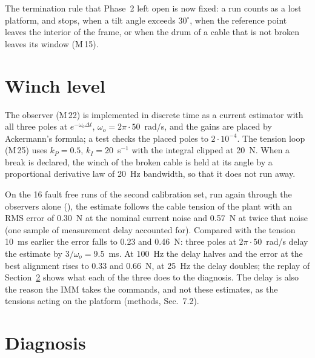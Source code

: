 \documentclass[10pt]{article}
\begin{document}
The termination rule that Phase~2 left open is now fixed: a run counts as a lost platform, and stops, when a tilt angle exceeds $30^\circ$, when the reference point leaves the interior of the frame, or when the drum of a cable that is not broken leaves its window (M\,15).

\section{Winch level}\label{sec:winch}

The observer (M\,22) is implemented in discrete time as a current estimator with all three poles at $e^{-\omega_o\Delta t}$, $\omega_o=2\pi\cdot50$~rad/s, and the gains are placed by Ackermann's formula; a test checks the placed poles to $2\cdot10^{-4}$. The tension loop (M\,25) uses $k_P=0.5$, $k_I=20$~s$^{-1}$ with the integral clipped at 20~N. When a break is declared, the winch of the broken cable is held at its angle by a proportional derivative law of 20~Hz bandwidth, so that it does not run away.

On the 16 fault free runs of the second calibration set, run again through the observers alone (), the estimate follows the cable tension of the plant with an RMS error of 0.30~N at the nominal current noise and 0.57~N at twice that noise (one sample of measurement delay accounted for). Compared with the tension 10~ms earlier the error falls to 0.23 and 0.46~N: three poles at $2\pi\cdot50$~rad/s delay the estimate by $3/\omega_o=9.5$~ms. At 100~Hz the delay halves and the error at the best alignment rises to 0.33 and 0.66~N, at 25~Hz the delay doubles; the replay of Section~\ref{sec:imm} shows what each of the three does to the diagnosis. The delay is also the reason the IMM takes the commands, and not these estimates, as the tensions acting on the platform (methods, Sec.~7.2).

\section{Diagnosis}\label{sec:imm}
\end{document}
